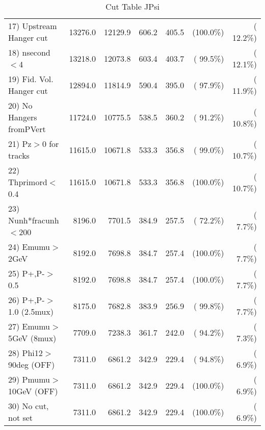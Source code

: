 \begin{table}[h!]
\begin{tabular}{||l||r|r|r|r|r|r||}
 17) Upstream Hanger cut  &      13276.0 &      12129.9 &        606.2 &        405.5 & (100.0\%) & ( 12.2\%) \\
 18) nsecond$<$4          &      13218.0 &      12073.8 &        603.4 &        403.7 & ( 99.5\%) & ( 12.1\%) \\
 19) Fid. Vol. Hanger cut &      12894.0 &      11814.9 &        590.4 &        395.0 & ( 97.9\%) & ( 11.9\%) \\
 20) No Hangers fromPVert &      11724.0 &      10775.5 &        538.5 &        360.2 & ( 91.2\%) & ( 10.8\%) \\
 21) Pz$>$0 for tracks    &      11615.0 &      10671.8 &        533.3 &        356.8 & ( 99.0\%) & ( 10.7\%) \\
 22) Thprimord$<$0.4      &      11615.0 &      10671.8 &        533.3 &        356.8 & (100.0\%) & ( 10.7\%) \\
 23) Nunh*fracunh$<$200   &       8196.0 &       7701.5 &        384.9 &        257.5 & ( 72.2\%) & (  7.7\%) \\
 24) Emumu$>$2GeV         &       8192.0 &       7698.8 &        384.7 &        257.4 & (100.0\%) & (  7.7\%) \\
 25) P+,P-$>$0.5          &       8192.0 &       7698.8 &        384.7 &        257.4 & (100.0\%) & (  7.7\%) \\
 26) P+,P-$>$1.0 (2.5mux) &       8175.0 &       7682.8 &        383.9 &        256.9 & ( 99.8\%) & (  7.7\%) \\
 27) Emumu$>$5GeV  (8mux) &       7709.0 &       7238.3 &        361.7 &        242.0 & ( 94.2\%) & (  7.3\%) \\
 28) Phi12$>$90deg  (OFF) &       7311.0 &       6861.2 &        342.9 &        229.4 & ( 94.8\%) & (  6.9\%) \\
 29) Pmumu$>$10GeV  (OFF) &       7311.0 &       6861.2 &        342.9 &        229.4 & (100.0\%) & (  6.9\%) \\
 30) No cut, not set      &       7311.0 &       6861.2 &        342.9 &        229.4 & (100.0\%) & (  6.9\%) \\
 \hline
 \hline
 \end{tabular}
 \caption{Cut Table  JPsi     }
 \label{tab-cutcohjpsi-mumu_cohrhop}
 \end{table}

